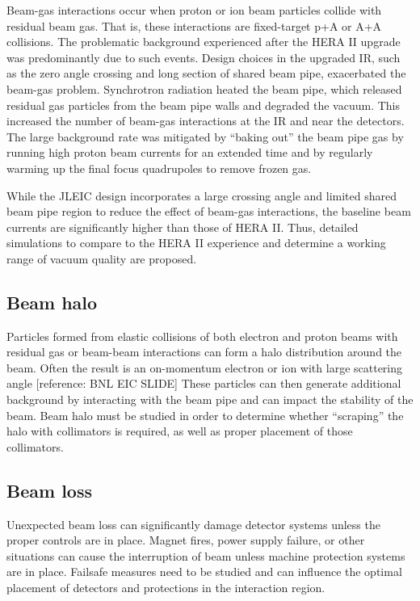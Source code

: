 Beam-gas interactions occur when proton or ion beam particles collide with residual beam gas.  That is, these interactions are fixed-target p+A or A+A collisions.  The problematic background experienced after the HERA II upgrade was predominantly due to such events.  Design choices in the upgraded IR, such as the zero angle crossing and long section of shared beam pipe, exacerbated the beam-gas problem.  Synchrotron radiation heated the beam pipe, which released residual gas particles from the beam pipe walls and degraded the vacuum.  This increased the number of beam-gas interactions at the IR and near the detectors.  The large background rate was mitigated by “baking out” the beam pipe gas by running high proton beam currents for an extended time and by regularly warming up the final focus quadrupoles to remove frozen gas.  

While the JLEIC design incorporates a large crossing angle and limited shared beam pipe region to reduce the effect of beam-gas interactions, the baseline beam currents are significantly higher than those of HERA II.  Thus, detailed simulations to compare to the HERA II experience and determine a working range of vacuum quality are proposed. 

\subsection{Beam halo}

Particles formed from elastic collisions of both electron and proton beams with residual gas or beam-beam interactions can form a halo distribution around the beam.  Often the result is an on-momentum electron or ion with large scattering angle [reference: BNL EIC SLIDE] These particles can then generate additional background by interacting with the beam pipe and can impact the stability of the beam.  Beam halo must be studied in order to determine whether “scraping” the halo with collimators is required, as well as proper placement of those collimators.

\subsection{Beam loss}

Unexpected beam loss can significantly damage detector systems unless the proper controls are in place.  Magnet fires, power supply failure, or other situations can cause the interruption of beam unless machine protection systems are in place.  Failsafe measures need to be studied and can influence the optimal placement of detectors and protections in the interaction region.

